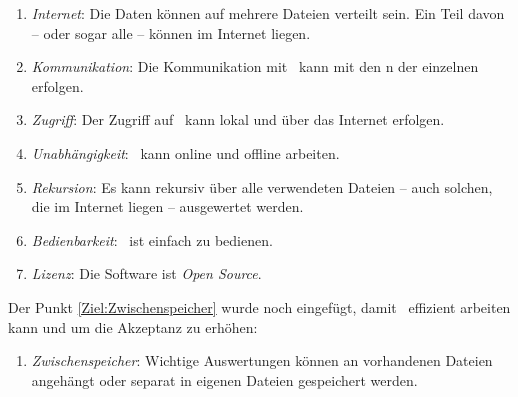 \begin{enumerate}
	\item \label{Ziel:Internet} \emph{Internet}:
	Die Daten können auf mehrere Dateien verteilt sein.
	Ein Teil davon -- oder sogar alle -- können im Internet liegen.
	
	\item \label{Ziel:Kommunikation} \emph{Kommunikation}:
	Die Kommunikation mit \ASBA\ kann mit den n der einzelnen  erfolgen.
	
	\item \label{Ziel:Zugriff} \emph{Zugriff}:
	Der Zugriff auf \ASBA\ kann lokal und über das Internet erfolgen.
	
	\item \label{Ziel:Unabhängigkeit} \emph{Unabhängigkeit}:
	\ASBA\ kann online und offline arbeiten.
	
	\item \label{Ziel:Rekursion} \emph{Rekursion}:
	Es kann rekursiv über alle verwendeten Dateien -- auch solchen, die im Internet liegen -- ausgewertet werden.
	
	\item \label{Ziel:Bedienbarkeit} \emph{Bedienbarkeit}:
	\ASBA\ ist einfach zu bedienen.
	
	\item \label{Ziel:Lizenz} \emph{Lizenz}:
	Die Software ist \emph{Open Source}.
	
	\setcounter{Enumi}{\value{enumi}}%
\end{enumerate}

Der Punkt \ref{Ziel:Zwischenspeicher} wurde noch eingefügt, damit \ASBA\ effizient arbeiten kann und um die Akzeptanz zu erhöhen:
\begin{enumerate}
	\setcounter{enumi}{\value{Enumi}}%
	
	\item \label{Ziel:Zwischenspeicher} \emph{Zwischenspeicher}:
	Wichtige Auswertungen können an vorhandenen Dateien angehängt oder separat in eigenen Dateien gespeichert werden.
	
\end{enumerate}

